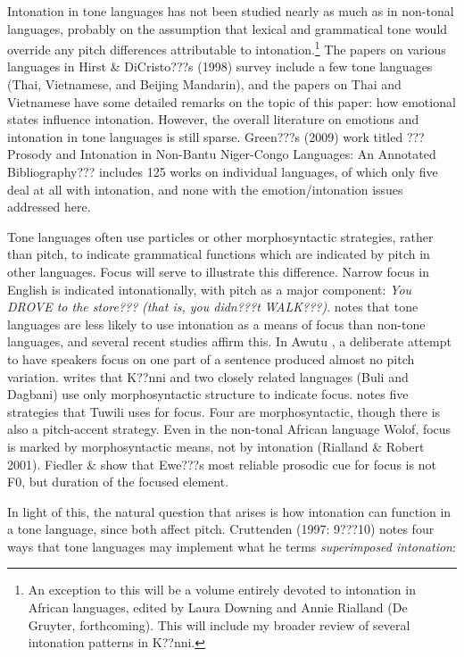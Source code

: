 \documentclass[output=paper]{langsci/langscibook}
\begin{document}
Intonation in tone languages has not been studied nearly as much as in non-tonal languages, probably on the assumption that lexical and grammatical tone would override any pitch differences attributable to intonation.\footnote{ An exception to this will be a volume entirely devoted to intonation in African languages, edited by Laura Downing and Annie Rialland (De Gruyter, forthcoming). This will include my broader review of several intonation patterns in K??nni.} The papers on various languages in Hirst \& DiCristo???s (1998) survey include a few tone languages (Thai, Vietnamese, and Beijing Mandarin), and the papers on Thai and Vietnamese have some detailed remarks on the topic of this paper: how emotional states influence intonation. However, the overall literature on emotions and intonation in tone languages is still sparse. Green???s (2009) work titled ???Prosody and Intonation in Non-Bantu Niger-Congo Languages: An Annotated Bibliography??? includes 125 works on individual languages, of which only five deal at all with intonation, and none with the emotion/intonation issues addressed here. 

Tone languages often use particles or other morphosyntactic strategies, rather than pitch, to indicate grammatical functions which are indicated by pitch in other languages. Focus will serve to illustrate this difference. Narrow focus in English is indicated intonationally, with pitch as a major component:  \emph{You DROVE to the store??? }\emph{\textup{(that is, you didn???t}}\emph{ WALK???}\emph{\textup{)}}. \citet[73]{Cruttenden1997} notes that tone languages are less likely to use intonation as a means of focus than non-tone languages, and several recent studies affirm this. In Awutu \citep{Lomotey2014}, a deliberate attempt to have speakers focus on one part of a sentence produced almost no pitch variation. \citet{Schwarz2009} writes that K??nni and two closely related languages (Buli and Dagbani) use only morphosyntactic structure to indicate focus. \citet{Harley2009} notes five strategies that Tuwili uses for focus. Four are morphosyntactic, though there is also a pitch-accent strategy. Even in the non-tonal African language Wolof, focus is marked by morphosyntactic means, not by intonation (Rialland \& Robert 2001).  Fiedler \& \citet{Jannedy2013} show that Ewe???s most reliable prosodic cue for focus is not F0, but duration of the focused element.

In light of this, the natural question that arises is how intonation can function in a tone language, since both affect pitch. Cruttenden (1997: 9???10) notes four ways that tone languages may implement what he terms \emph{superimposed intonation}:
\end{document}
